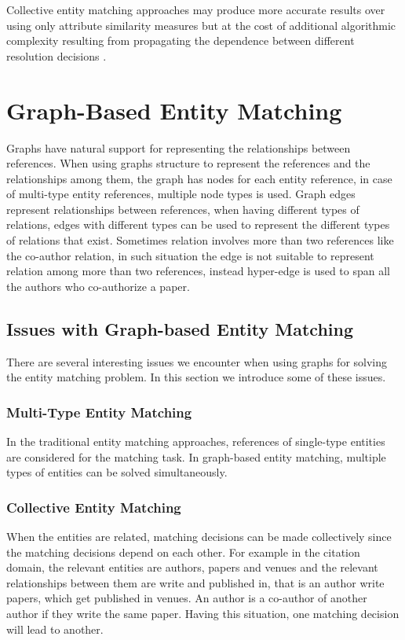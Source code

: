 Collective entity matching approaches may produce more accurate results over using only attribute similarity measures but at the cost of additional algorithmic complexity resulting from propagating the dependence between different resolution decisions \cite{BhGe07}.

\section{Graph-Based Entity Matching}
Graphs have natural support for representing the relationships between references. When using graphs structure to represent the references and the relationships among them, the graph has nodes for each entity reference, in case of multi-type entity references, multiple node types is used. Graph edges represent relationships between references, when having different types of relations, edges with different types can be used to represent the different types of relations that exist. Sometimes relation involves more than two references like the co-author relation, in such situation the edge is not suitable to represent relation among more than two references, instead hyper-edge is used to span all the authors who co-authorize a paper\cite{BhGe06b}.
  
\subsection{Issues with Graph-based Entity Matching}
There are several interesting issues we encounter when using graphs for solving the entity matching problem. In this section we introduce some of these issues\cite{BhGe06b}.  
\subsubsection{Multi-Type Entity Matching}
In the traditional entity matching approaches, references of single-type entities are considered for the matching task. In graph-based entity matching, multiple types of entities can be solved simultaneously. 
\subsubsection{Collective Entity Matching}
When the entities are related, matching decisions can be made collectively since the matching decisions depend on each other. For example in the citation domain, the relevant entities are authors, papers and venues and the relevant relationships between them are write and published in,  that is an author write papers, which get published in venues. An author is a co-author of another author if they write the same paper. Having this situation, one matching decision will lead to another.
